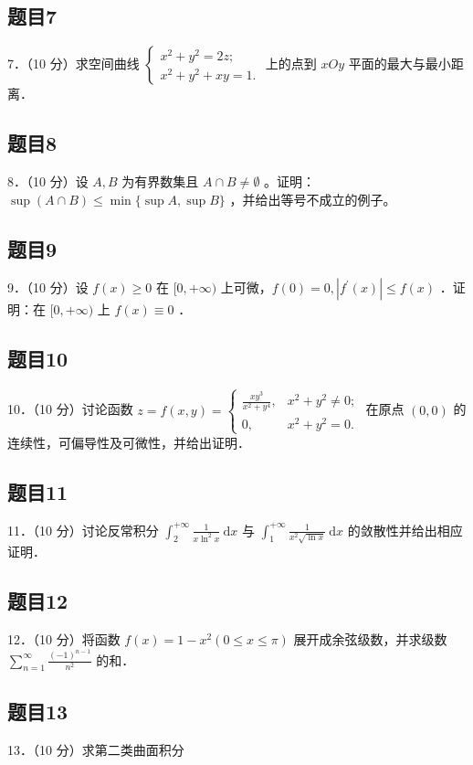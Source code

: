 \documentclass{article}
\begin{document}
\subsection{题目7}
7．（10 分）求空间曲线 \(\left\{\begin{array}{l}x^{2}+y^{2}=2 z ; \\ x^{2}+y^{2}+x y=1 .\end{array}\right.\) 上的点到 \(x O y\) 平面的最大与最小距离．

\subsection{题目8}
8．（10 分）设 \(A, B\) 为有界数集且 \(A \cap B \neq \emptyset\) 。证明： \(\sup (A \cap B) \leq \min \{\sup A, \sup B\}\) ，并给出等号不成立的例子。

\subsection{题目9}
9．（10 分）设 \(f(x) \geq 0\) 在 \([0,+\infty)\) 上可微，\(f(0)=0,\left|f^{\prime}(x)\right| \leq f(x)\) ．证明：在 \([0,+\infty)\) 上 \(f(x) \equiv 0\) ．

\subsection{题目10}
10．（10 分）讨论函数 \(z=f(x, y)=\left\{\begin{array}{ll}\frac{x y^{3}}{x^{2}+y^{4}}, & x^{2}+y^{2} \neq 0 ; \\ 0, & x^{2}+y^{2}=0 .\end{array}\right.\) 在原点 \((0,0)\) 的连续性，可偏导性及可微性，并给出证明．

\subsection{题目11}
11．（10 分）讨论反常积分 \(\int_{2}^{+\infty} \frac{1}{x \ln ^{2} x} \mathrm{~d} x\) 与 \(\int_{1}^{+\infty} \frac{1}{x^{2} \sqrt{\ln x}} \mathrm{~d} x\) 的敛散性并给出相应证明．

\subsection{题目12}
12．（10 分）将函数 \(f(x)=1-x^{2}(0 \leq x \leq \pi)\) 展开成余弦级数，并求级数 \(\sum_{n=1}^{\infty} \frac{(-1)^{n-1}}{n^{2}}\) 的和．

\subsection{题目13}
13．（10 分）求第二类曲面积分
\end{document}

